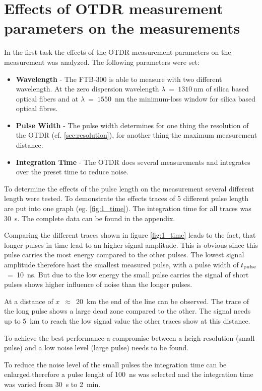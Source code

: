 \section{Effects of OTDR measurement parameters on the measurements}
In the first task the effects of the OTDR measurement parameters on the measurement was analyzed. 
The following parameters were set:
\begin{itemize}
	\item \textbf{Wavelength} - The FTB-300 is able to measure with two different wavelength. At the zero dispersion wavelength $\lambda ~=~1310~$nm  of silica based optical fibers and at $\lambda~=~1550$~nm the minimum-loss window for silica based optical fibres.
	\item \textbf{Pulse Width} - The pulse width determines for one thing the resolution of the OTDR (cf. \ref{sec:resolution}), for another thing the maximum measurement distance. 
	\item \textbf{Integration Time} - The OTDR does several measurements and integrates over the preset time to reduce noise. 
\end{itemize}

To determine the effects of the pulse length on the measurement several different length were tested. To demonstrate the effects traces of 5 different pulse length are put into one graph (eg. \ref{fig:1_time}). The integration time for all traces was 30~s. The complete data can be found in the appendix.

Comparing the different traces shown in figure \ref{fig:1_time} leads to the fact, that longer pulses in time lead to an higher signal amplitude. This is obvious since this pulse carries the most energy compared to the other pulses. 
The lowest signal amplitude therefore hast the smallest measured pulse, with a pulse width of $t_{\mathrm{pulse}}$~=~10~ns. But due to the low energy the small pulse carries the signal of short pulses shows higher influence of noise than the longer pulses. 

At a distance of $x$~$\approx$~20~km the end of the line can be observed.
The trace of the long pulse shows a large dead zone compared to the other. The signal needs up to 5~km to reach the low signal value the other traces show at this distance. 

To achieve the best performance a compromise between a heigh resolution (small pulse) and a low noise level (large pulse) needs to be found.

To reduce the noise level of the small pulses the integration time can be enlarged.therefore a pulse lenght of 100~ns was selected and the integration time was varied from 30~s to 2~min. 

